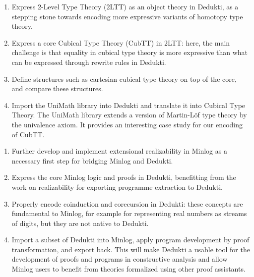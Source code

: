 \begin{workpackage}[id=theories,wphases=0-48,type=RTD,
  short=Theories in Dedukti,%
  title= Defining theories in Dedukti,
  lead=Inn,
  InnRM=6,
  BiaRM=48,
  LmuRM=12,
  SacRM=36,
  InrRM=24,
  ]
\begin{tasklist}
\begin{task}[id=hott,
  title=Express Homotopy Type Theory in Dedukti,
  lead=Inr, %
  InrRM=0, %
  BirRM=0 %
  ]
  \begin{enumerate}
  \item Express 2-Level Type Theory (2LTT) as an object theory in Dedukti, as
    a stepping stone towards encoding more expressive variants of homotopy type
    theory.
  \item Express a core Cubical Type Theory (CubTT) in 2LTT: here, the main challenge is
    that equality in cubical type theory is more expressive than what can be
    expressed through rewrite rules in Dedukti.
  \item Define structures such as cartesian cubical type theory on top of the
    core, and compare these structures.
  \item Import the UniMath library into Dedukti and translate it into Cubical
    Type Theory. The UniMath library extends a version of
    Martin-Löf type theory by the univalence axiom. It provides an interesting
    case study for our encoding of CubTT.
  \end{enumerate}
\end{task}

\begin{task}[id=minlog,
  title=Express the theory of Minlog in Dedukti,
  lead=Lmu,
  LmuRM=0 %
  ]
  \begin{enumerate}
  \item Further develop and implement extensional realizability in Minlog as
    a necessary first step for bridging Minlog and Dedukti.
  \item Express the core Minlog logic and proofs in Dedukti, benefitting from
    the work on realizability for exporting programme extraction to Dedukti.
  \item Properly encode coinduction and corecursion in Dedukti: these concepts are
    fundamental to Minlog, for example for representing real numbers as streams of
    digits, but they are not native to Dedukti.
  \item Import a subset of Dedukti into Minlog, apply program development by proof
    transformation, and export back. This will make Dedukti a usable tool for the
    development of proofs and programs in constructive analysis and allow Minlog
    users to benefit from theories formalized using other proof assistants.
  \end{enumerate}
\end{task}


\end{tasklist}
\end{workpackage}
